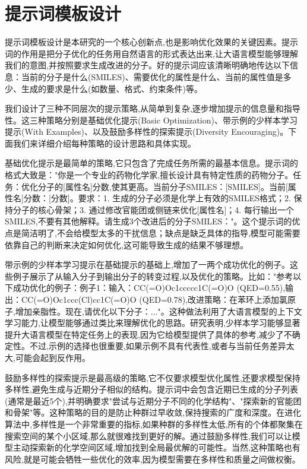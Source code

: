 \section{提示词模板设计}

提示词模板设计是本研究的一个核心创新点,也是影响优化效果的关键因素。提示词的作用是把分子优化的任务用自然语言的形式表达出来,让大语言模型能够理解我们的意图,并按照要求生成改进的分子。好的提示词应该清晰明确地传达以下信息：当前的分子是什么(SMILES)、需要优化的属性是什么、当前的属性值是多少、生成的要求是什么(如数量、格式、约束条件)等。

我们设计了三种不同层次的提示策略,从简单到复杂,逐步增加提示的信息量和指导性。这三种策略分别是基础优化提示(Basic Optimization)、带示例的少样本学习提示(With Examples)、以及鼓励多样性的探索提示(Diversity Encouraging)。下面我们来详细介绍每种策略的设计思路和具体实现。

基础优化提示是最简单的策略,它只包含了完成任务所需的最基本信息。提示词的格式大致是："你是一个专业的药物化学家,擅长设计具有特定性质的药物分子。任务：优化分子的[属性名]分数,使其更高。当前分子SMILES：[SMILES]。当前[属性名]分数：[分数]。要求：1. 生成的分子必须是化学上有效的SMILES格式；2. 保持分子的核心骨架；3. 通过修改官能团或侧链来优化[属性名]；4. 每行输出一个SMILES,不要有其他解释。请生成3个改进后的分子SMILES："。这个提示词的优点是简洁明了,不会给模型太多的干扰信息；缺点是缺乏具体的指导,模型可能需要依靠自己的判断来决定如何优化,这可能导致生成的结果不够理想。

带示例的少样本学习提示在基础提示的基础上,增加了一两个成功优化的例子。这些例子展示了从输入分子到输出分子的转变过程,以及优化的策略。比如："参考以下成功优化的例子：例子1：输入：CC(=O)Oc1ccccc1C(=O)O (QED=0.55),输出：CC(=O)Oc1ccc(Cl)cc1C(=O)O (QED=0.78),改进策略：在苯环上添加氯原子,增加亲脂性。现在,请优化以下分子：..."。这种做法利用了大语言模型的上下文学习能力,让模型能够通过类比来理解优化的思路。研究表明,少样本学习能够显著提升大语言模型在特定任务上的表现,因为它给模型提供了具体的参考,减少了不确定性。不过,示例的选择也很重要,如果示例不具有代表性,或者与当前任务差异太大,可能会起到反作用。

鼓励多样性的探索提示是最高级的策略,它不仅要求模型优化属性,还要求模型保持多样性,避免生成与近期分子相似的结构。提示词中会包含近期已生成的分子列表(通常是最近5个),并明确要求"尝试与近期分子不同的化学结构"、"探索新的官能团和骨架"等。这种策略的目的是防止种群过早收敛,保持搜索的广度和深度。在进化算法中,多样性是一个非常重要的指标,如果种群的多样性太低,所有的个体都聚集在搜索空间的某个小区域,那么就很难找到更好的解。通过鼓励多样性,我们可以让模型主动探索新的化学空间区域,增加找到全局最优解的可能性。当然,这种策略也有风险,就是可能会牺牲一些优化的效率,因为模型需要在多样性和质量之间做权衡。

